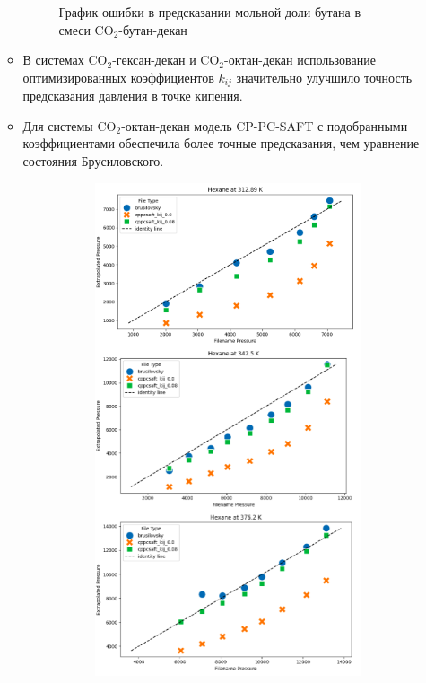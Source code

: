 \documentclass[a4paper,12pt]{article}
\begin{document}
\begin{itemize}
\begin{itemize}
\begin{figure}[ht]
    \caption{График ошибки в предсказании мольной доли бутана в смеси $\mathrm{CO}_{2}$-бутан-декан}
    \label{fig:3butane}
\end{figure}
	    \item В системах $\mathrm{CO}_{2}$-гексан-декан и $\mathrm{CO}_{2}$-октан-декан использование оптимизированных коэффициентов $k_{ij}$ значительно улучшило точность предсказания давления в точке кипения.
	    \item Для системы $\mathrm{CO}_{2}$-октан-декан модель CP-PC-SAFT с подобранными коэффициентами обеспечила более точные предсказания, чем уравнение состояния Брусиловского.
\begin{figure}[ht]
    \centering
    \begin{subfigure}{0.48\textwidth}
        \centering
        \includegraphics[width=\textwidth]{images/3_hexane_boiling.png} %

\end{subfigure}
\end{figure}
\end{itemize}
\end{itemize}
\end{document}
